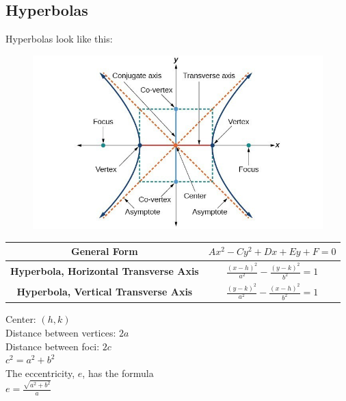 \documentclass{article}
\begin{document}
    \subsection{Hyperbolas}
    Hyperbolas look like this: \\
    \begin{figure} [hbt!]
        \centering
        \includegraphics [scale=0.3] {Resources/Unit10Conics/hyperbola.png}
    \end{figure}

    \begin{center}
        \begin{tabular} {|c|c|}
            \hline
            \textbf{General Form}
            & $Ax^2-Cy^2+Dx+Ey+F=0$                       \\
            \hline
            \textbf{Hyperbola, Horizontal Transverse Axis}
            & $\frac{(x-h)^2}{a^2}-\frac{(y-k)^2}{b^2}=1$ \\
            \hline
            \textbf{Hyperbola, Vertical Transverse Axis}
            & $\frac{(y-k)^2}{a^2}-\frac{(x-h)^2}{b^2}=1$ \\
            \hline
        \end{tabular}
    \end{center}

    \noindent Center: $(h,k)$ \\
    Distance between vertices: $2a$ \\
    Distance between foci: $2c$ \\
    $c^2=a^2+b^2$ \\

    \noindent The eccentricity, $e$, has the formula \\
    $e=\frac{\sqrt{a^2+b^2}}{a}$  \\
\end{document}
